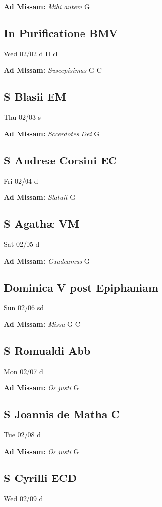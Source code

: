 \documentclass[letterpaper, 10pt, twocolumn]{article}
\begin{document}
\textbf{Ad Missam:} \textit{Mihi autem} G 

\subsection*{In Purificatione BMV}Wed 02/02 d II cl

\textbf{Ad Missam:} \textit{Suscepisimus} G C 

\subsection*{S Blasii EM}Thu 02/03 s

\textbf{Ad Missam:} \textit{Sacerdotes Dei} G 

\subsection*{S Andreæ Corsini EC}Fri 02/04 d

\textbf{Ad Missam:} \textit{Statuit} G 

\subsection*{S Agathæ VM}Sat 02/05 d

\textbf{Ad Missam:} \textit{Gaudeamus} G 

\subsection*{Dominica V post Epiphaniam}Sun 02/06 sd

\textbf{Ad Missam:} \textit{Missa} G C 

\subsection*{S Romualdi Abb}Mon 02/07 d

\textbf{Ad Missam:} \textit{Os justi} G 

\subsection*{S Joannis de Matha C}Tue 02/08 d

\textbf{Ad Missam:} \textit{Os justi} G 

\subsection*{S Cyrilli ECD}Wed 02/09 d
\end{document}
